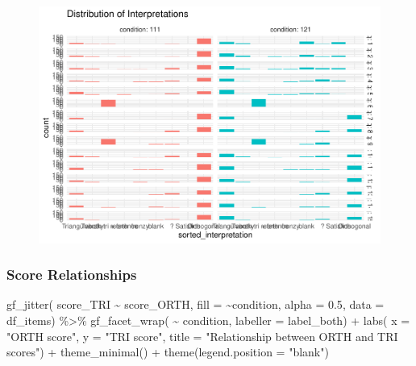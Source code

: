 \documentclass[
  letterpaper,
  DIV=11,
  numbers=noendperiod]{scrreprt}
\newenvironment{Shaded}{\begin{snugshade}}{\end{snugshade}}
\newcommand{\AttributeTok}[1]{\textcolor[rgb]{0.40,0.45,0.13}{#1}}
\newcommand{\FloatTok}[1]{\textcolor[rgb]{0.68,0.00,0.00}{#1}}
\newcommand{\FunctionTok}[1]{\textcolor[rgb]{0.28,0.35,0.67}{#1}}
\newcommand{\NormalTok}[1]{\textcolor[rgb]{0.00,0.23,0.31}{#1}}
\newcommand{\SpecialCharTok}[1]{\textcolor[rgb]{0.37,0.37,0.37}{#1}}
\newcommand{\StringTok}[1]{\textcolor[rgb]{0.13,0.47,0.30}{#1}}
\begin{document}
\begin{figure}[H]

{\centering \includegraphics{analysis/SGC3A/2_sgc3A_scoring_files/figure-pdf/unnamed-chunk-83-4.pdf}

}

\end{figure}

\hypertarget{score-relationships}{%
\subsubsection{Score Relationships}\label{score-relationships}}

\begin{Shaded}
\begin{Highlighting}[]
\FunctionTok{gf\_jitter}\NormalTok{( score\_TRI }\SpecialCharTok{\textasciitilde{}}\NormalTok{ score\_ORTH, }\AttributeTok{fill =} \SpecialCharTok{\textasciitilde{}}\NormalTok{condition, }\AttributeTok{alpha =} \FloatTok{0.5}\NormalTok{, }\AttributeTok{data =}\NormalTok{ df\_items) }\SpecialCharTok{\%\textgreater{}\%} 
  \FunctionTok{gf\_facet\_wrap}\NormalTok{( }\SpecialCharTok{\textasciitilde{}}\NormalTok{ condition, }\AttributeTok{labeller =}\NormalTok{ label\_both) }\SpecialCharTok{+} 
  \FunctionTok{labs}\NormalTok{( }\AttributeTok{x =} \StringTok{"ORTH score"}\NormalTok{, }\AttributeTok{y =} \StringTok{"TRI score"}\NormalTok{, }
        \AttributeTok{title =} \StringTok{"Relationship between ORTH and TRI scores"}\NormalTok{) }\SpecialCharTok{+} \FunctionTok{theme\_minimal}\NormalTok{() }\SpecialCharTok{+} \FunctionTok{theme}\NormalTok{(}\AttributeTok{legend.position =} \StringTok{"blank"}\NormalTok{)}
\end{Highlighting}
\end{Shaded}
\end{document}
